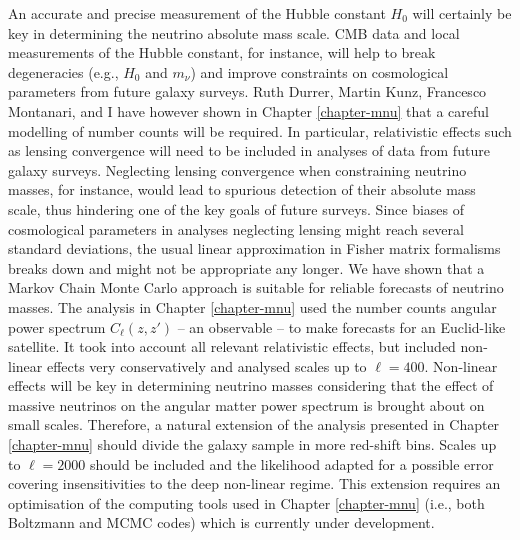 An accurate and precise measurement of the Hubble constant $H_0$ will certainly be key in determining the neutrino absolute mass scale. CMB data and local measurements of the Hubble constant, for instance, will help to break degeneracies (e.g., $H_0$ and $m_\nu$) and improve constraints on cosmological parameters from future galaxy surveys.  Ruth Durrer, Martin Kunz, Francesco Montanari, and I have however shown in Chapter \ref{chapter-mnu} that a careful modelling of number counts will be required. In particular, relativistic effects such as lensing convergence will need to be included in analyses of data from future galaxy surveys. Neglecting lensing convergence when constraining neutrino masses, for instance, would lead to spurious detection of their absolute mass scale, thus hindering one of the key goals of future surveys. Since biases of cosmological parameters in analyses neglecting lensing might reach several standard deviations, the usual linear approximation in Fisher matrix formalisms breaks down and might not be appropriate any longer. We have shown that a Markov Chain Monte Carlo approach is suitable for reliable forecasts of neutrino masses. The analysis in Chapter \ref{chapter-mnu} used the number counts angular power spectrum $C_\ell(z,z')$ -- an observable -- to make forecasts for an Euclid-like satellite. It took into account all relevant relativistic effects, but included non-linear effects very conservatively and analysed scales up to $\ell=400$. Non-linear effects will be key in determining neutrino masses considering that the effect of massive neutrinos on the angular matter power spectrum is brought about on small scales. Therefore, a natural extension of the analysis presented in Chapter \ref{chapter-mnu} should divide the galaxy sample in more red-shift bins. Scales up to $\ell=2000$ should be included and the likelihood adapted for a possible error covering insensitivities to the deep non-linear regime.
This extension requires an optimisation of the computing tools used in Chapter \ref{chapter-mnu} (i.e., both Boltzmann and MCMC codes) which is currently under development.   

